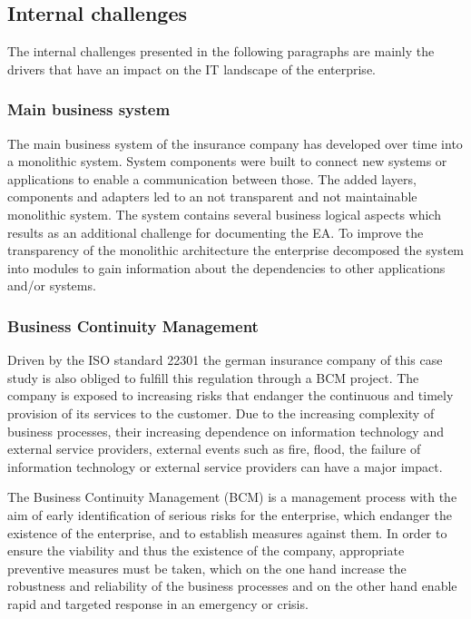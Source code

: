 \subsection{Internal challenges}\label{subsection:internalinfluencingfactors}

The internal challenges presented in the following paragraphs are mainly the drivers that have an impact on the IT landscape of the enterprise.

\subsubsection{Main business system}

The main business system of the insurance company has developed over time into a monolithic system. System components were built to connect new systems or applications to enable a communication between those. The added layers, components and adapters led to an not transparent and not maintainable monolithic system. The system contains several business logical aspects which results as an additional challenge for documenting the EA. To improve the transparency of the monolithic architecture the enterprise decomposed the system into modules to gain information about the dependencies to other applications and/or systems. 

\subsubsection{Business Continuity Management}

Driven by the ISO standard 22301 the german insurance company of this case study is also obliged to fulfill this regulation through a BCM project. The company is exposed to increasing risks that endanger the continuous and timely provision of its services to the customer. 
Due to the increasing complexity of business processes, their increasing dependence on information technology and external service providers, external events such as fire, flood, the failure of information technology or external service providers can have a major impact.

The Business Continuity Management (BCM) is a management process with the aim of early identification of serious risks for the enterprise, which endanger the existence of the enterprise, and to establish measures against them. In order to ensure the viability and thus the existence of the company, appropriate preventive measures must be taken, which on the one hand increase the robustness and reliability of the business processes and on the other hand enable rapid and targeted response in an emergency or crisis.

